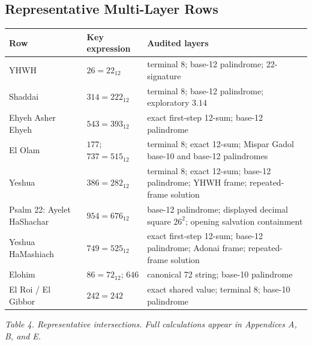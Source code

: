 \subsection{Representative Multi-Layer Rows}

\begin{center}
\begin{minipage}{0.96\linewidth}
\centering
\small
\begin{tabular}{>{\raggedright\arraybackslash}p{3.1cm}>{\raggedright\arraybackslash}p{3.0cm}>{\raggedright\arraybackslash}p{6.8cm}}
\toprule
Row & Key expression & Audited layers \\
\midrule
YHWH & $26=22_{12}$ & terminal 8; base-12 palindrome; 22-signature \\
Shaddai & $314=222_{12}$ & terminal 8; base-12 palindrome; exploratory $3.14$ \\
Ehyeh Asher Ehyeh & $543=393_{12}$ & exact first-step 12-sum; base-12 palindrome \\
El Olam & $177$; $737=515_{12}$ & terminal 8; exact 12-sum; Mispar Gadol base-10 and base-12 palindromes \\
Yeshua & $386=282_{12}$ & terminal 8; exact 12-sum; base-12 palindrome; YHWH frame; repeated-frame solution \\
Psalm 22: Ayelet HaShachar & $954=676_{12}$ & base-12 palindrome; displayed decimal square $26^2$; opening salvation containment \\
Yeshua HaMashiach & $749=525_{12}$ & exact first-step 12-sum; base-12 palindrome; Adonai frame; repeated-frame solution \\
Elohim & $86=72_{12}$; $646$ & canonical 72 string; base-10 palindrome \\
El Roi / El Gibbor & $242=242$ & exact shared value; terminal 8; base-10 palindrome \\
\bottomrule
\end{tabular}

\smallskip
\textit{Table 4. Representative intersections. Full calculations appear in Appendices A, B, and E.}
\end{minipage}
\end{center}
